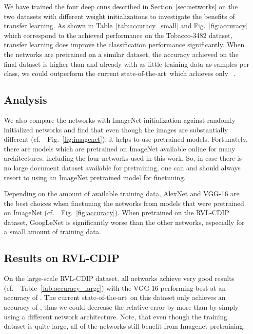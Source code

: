 \documentclass[conference]{IEEEtran}
\newcommand*{\cf}		{cf.\ }
\newcommand*{\sota}		{state-of-the-art\ }
\begin{document}
We have trained the four deep \ac{cnn}s described in Section~\ref{sec:networks} on the two datasets with different weight initializations to investigate the benefits of transfer learning. As shown in Table~\ref{tab:accuracy_small} and Fig.~\ref{fig:accuracy} which correspond to the achieved performance on the Tobacco-3482 dataset, transfer learning does improve the classification performance significantly. When the networks are pretrained on a similar dataset, the accuracy achieved on the final dataset is higher than  and already with as little training data as  samples per class, we could outperform the current \sota which achieves only ~\cite{afzal2015deepdocclassifier}.


\subsection{Analysis}

We also compare the networks with ImageNet initialization against randomly initialized networks and find that even though the images are substantially different (\cf~Fig.~\ref{fig:imagenet}), it helps to use pretrained models. Fortunately, there are models which are pretrained on ImageNet available online for many architectures, including the four networks used in this work. So, in case there is no large document dataset available for pretraining, one can and should always resort to using an ImageNet pretrained model for finetuning.

Depending on the amount of available training data, AlexNet and VGG-16 are the best choices when finetuning the networks from models that were pretrained on ImageNet (\cf~Fig.~\ref{fig:accuracy}). When pretrained on the RVL-CDIP dataset, GoogLeNet is significantly worse than the other networks, especially for a small amount of training data.


\subsection{Results on RVL-CDIP}

On the large-scale RVL-CDIP dataset, all networks achieve very good results (\cf~Table~\ref{tab:accuracy_large}) with the VGG-16 performing best at an accuracy of . The current \sota on this dataset only achieves an accuracy of , thus we could decrease the relative error by more than  by simply using a different network architecture.
Note, that even though the training dataset is quite large, all of the networks still benefit from Imagenet pretraining.
\end{document}
